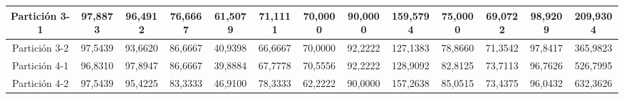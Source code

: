 \documentclass[12pt]{article}
\begin{document}
\begin{table}[H]
{\begin{tabular}{|c|cccc|cccc|cccc|}
Partición 3-1 & \multicolumn{1}{c|}{97,8873}                                                  & \multicolumn{1}{c|}{96,4912}                                                 & \multicolumn{1}{c|}{76,6667} & 61,5079 & \multicolumn{1}{c|}{71,1111}                                                  & \multicolumn{1}{c|}{70,0000}                                                 & \multicolumn{1}{c|}{90,0000} & 159,5794 & \multicolumn{1}{c|}{75,0000}                                                  & \multicolumn{1}{c|}{69,0722}                                                 & \multicolumn{1}{c|}{98,9209} & 209,9304 \\ \hline
Partición 3-2 & \multicolumn{1}{c|}{97,5439}                                                  & \multicolumn{1}{c|}{93,6620}                                                 & \multicolumn{1}{c|}{86,6667} & 40,9398 & \multicolumn{1}{c|}{66,6667}                                                  & \multicolumn{1}{c|}{70,0000}                                                 & \multicolumn{1}{c|}{92,2222} & 127,1383 & \multicolumn{1}{c|}{78,8660}                                                  & \multicolumn{1}{c|}{71,3542}                                                 & \multicolumn{1}{c|}{97,8417} & 365,9823 \\ \hline
Partición 4-1 & \multicolumn{1}{c|}{96,8310}                                                  & \multicolumn{1}{c|}{97,8947}                                                 & \multicolumn{1}{c|}{86,6667} & 39,8884 & \multicolumn{1}{c|}{67,7778}                                                  & \multicolumn{1}{c|}{70,5556}                                                 & \multicolumn{1}{c|}{92,2222} & 128,9092 & \multicolumn{1}{c|}{82,8125}                                                  & \multicolumn{1}{c|}{73,7113}                                                 & \multicolumn{1}{c|}{96,7626} & 526,7995 \\ \hline
Partición 4-2 & \multicolumn{1}{c|}{97,5439}                                                  & \multicolumn{1}{c|}{95,4225}                                                 & \multicolumn{1}{c|}{83,3333} & 46,9100 & \multicolumn{1}{c|}{78,3333}                                                  & \multicolumn{1}{c|}{62,2222}                                                 & \multicolumn{1}{c|}{90,0000} & 157,2638 & \multicolumn{1}{c|}{85,0515}                                                  & \multicolumn{1}{c|}{73,4375}                                                 & \multicolumn{1}{c|}{96,0432} & 632,3626 \\ \hline

\end{tabular}}
\end{table}
\end{document}
